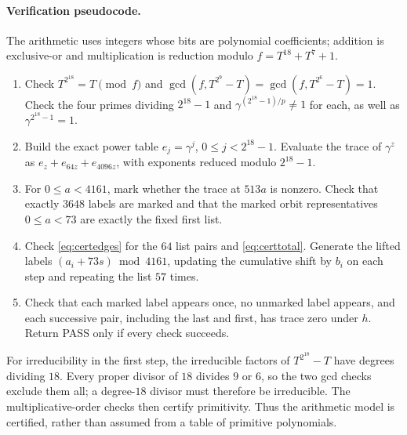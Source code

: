 \documentclass[11pt]{article}
\theoremstyle{definition}
\begin{document}
\paragraph{Verification pseudocode.}
The arithmetic uses integers whose bits are polynomial coefficients; addition is exclusive-or and multiplication is reduction modulo $f=T^{18}+T^7+1$.
\begin{enumerate}
\item Check $T^{2^{18}}=T\pmod f$ and $\gcd(f,T^{2^9}-T)=\gcd(f,T^{2^6}-T)=1$. Check the four primes dividing $2^{18}-1$ and $\gamma^{(2^{18}-1)/p}\ne1$ for each, as well as $\gamma^{2^{18}-1}=1$.
\item Build the exact power table $e_j=\gamma^j$, $0\le j<2^{18}-1$. Evaluate the trace of $\gamma^z$ as $e_z+e_{64z}+e_{4096z}$, with exponents reduced modulo $2^{18}-1$.
\item For $0\le a<4161$, mark whether the trace at $513a$ is nonzero. Check that exactly $3648$ labels are marked and that the marked orbit representatives $0\le a<73$ are exactly the fixed first list.
\item Check \eqref{eq:certedges} for the $64$ list pairs and \eqref{eq:certtotal}. Generate the lifted labels $(a_i+73s)\bmod4161$, updating the cumulative shift by $b_i$ on each step and repeating the list $57$ times.
\item Check that each marked label appears once, no unmarked label appears, and each successive pair, including the last and first, has trace zero under $h$. Return PASS only if every check succeeds.
\end{enumerate}
For irreducibility in the first step, the irreducible factors of $T^{2^{18}}-T$ have degrees dividing $18$. Every proper divisor of $18$ divides $9$ or $6$, so the two gcd checks exclude them all; a degree-$18$ divisor must therefore be irreducible. The multiplicative-order checks then certify primitivity. Thus the arithmetic model is certified, rather than assumed from a table of primitive polynomials.
\end{document}
